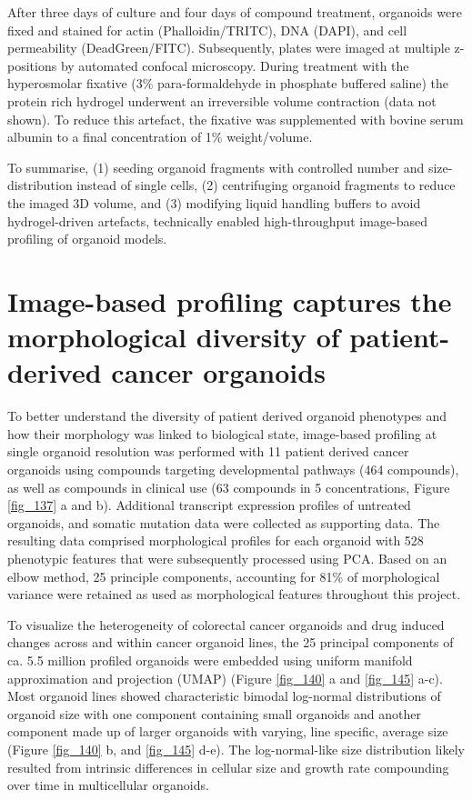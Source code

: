 \begin{flushleft}
After three days of culture and four days of compound treatment, organoids were fixed and stained for actin (Phalloidin/TRITC), DNA (DAPI), and cell permeability (DeadGreen/FITC). Subsequently, plates were imaged at multiple z-positions by automated confocal microscopy. During treatment with the hyperosmolar fixative (3\% para-formaldehyde in phosphate buffered saline) the protein rich hydrogel underwent an irreversible volume contraction (data not shown). To reduce this artefact, the fixative was supplemented with bovine serum albumin to a final concentration of 1\% weight/volume.
\par
To summarise, (1) seeding organoid fragments with controlled number and size-distribution instead of single cells, (2) centrifuging organoid fragments to reduce the imaged 3D volume, and (3) modifying liquid handling buffers to avoid hydrogel-driven artefacts, technically enabled high-throughput image-based profiling of organoid models. 
\bigbreak

\section{Image-based profiling captures the morphological diversity of patient-derived cancer organoids}
To better understand the diversity of patient derived organoid phenotypes and how their morphology was linked to biological state, image-based profiling at single organoid resolution was performed with 11 patient derived cancer organoids using compounds targeting developmental pathways (464 compounds), as well as compounds in clinical use (63 compounds in 5 concentrations, Figure \ref{fig_137} a and b). Additional transcript expression profiles of untreated organoids, and somatic mutation data were collected as supporting data. The resulting data comprised morphological profiles for each organoid with 528 phenotypic features that were subsequently processed using PCA. Based on an elbow method, 25 principle components, accounting for 81\% of morphological variance were retained as used as morphological features throughout this project. 

To visualize the heterogeneity of colorectal cancer organoids and drug induced changes across and within cancer organoid lines, the 25 principal components of  ca. 5.5 million profiled organoids were embedded using uniform manifold approximation and projection (UMAP) (Figure \ref{fig_140} a and \ref{fig_145} a-c). Most organoid lines showed characteristic bimodal log-normal distributions of organoid size with one component containing small organoids and another component made up of larger organoids with varying, line specific, average size (Figure \ref{fig_140} b, and \ref{fig_145} d-e). The log-normal-like size distribution likely resulted from intrinsic differences in cellular size and growth rate compounding over time in multicellular organoids. 


\end{flushleft}
